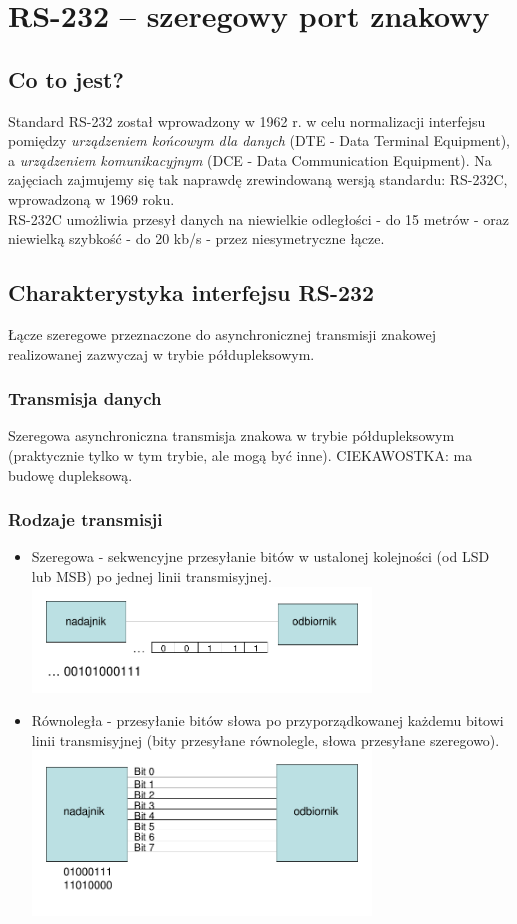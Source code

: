 \section{RS-232 – szeregowy port znakowy}
	\subsection{Co to jest?}
	Standard RS-232 został wprowadzony w 1962 r. w celu normalizacji interfejsu pomiędzy \textit{urządzeniem końcowym dla danych} (DTE - Data Terminal Equipment), a \textit{urządzeniem komunikacyjnym} (DCE - Data Communication Equipment). Na zajęciach zajmujemy się tak naprawdę zrewindowaną wersją standardu: RS-232C, wprowadzoną w 1969 roku.\\
	RS-232C umożliwia przesył danych na niewielkie odległości - do 15 metrów - oraz niewielką szybkość - do 20 kb/s - przez niesymetryczne łącze.
	\subsection{Charakterystyka interfejsu RS-232}
		Łącze szeregowe przeznaczone do asynchronicznej transmisji znakowej realizowanej zazwyczaj w trybie półdupleksowym.
		\subsubsection{Transmisja danych}
		Szeregowa asynchroniczna transmisja znakowa w trybie półdupleksowym (praktycznie tylko w tym trybie, ale mogą być inne). CIEKAWOSTKA: ma budowę dupleksową.
		\subsubsection{Rodzaje transmisji}
		\begin{itemize}
			\item Szeregowa - sekwencyjne przesyłanie bitów w ustalonej kolejności (od LSD lub MSB) po jednej linii transmisyjnej.\\
			\includegraphics[width=9cm]{./wyklady/RS232_2_1.pdf}
			\item Równoległa - przesyłanie bitów słowa po przyporządkowanej każdemu bitowi linii transmisyjnej (bity przesyłane równolegle, słowa przesyłane szeregowo).\\
			\includegraphics[width=9cm]{./wyklady/RS232_2_2.pdf}
		\end{itemize}
	\newpage

